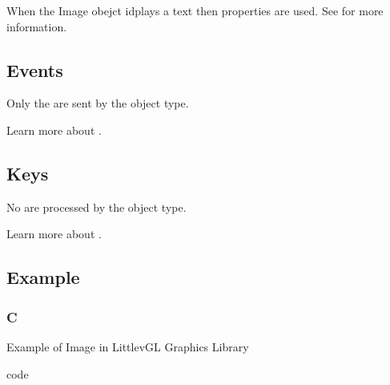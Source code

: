 \documentclass[letterpaper,10pt,english]{sphinxmanual}
\begin{document}
When the Image obejct idplays a text then  properties are used. See {\hyperref[\detokenize{object-types/label::doc}]{}} for more information.


\subsection{Events}
\label{\detokenize{object-types/img:events}}
Only the  are sent by the object type.

Learn more about {\hyperref[\detokenize{overview/events::doc}]{}}.


\subsection{Keys}
\label{\detokenize{object-types/img:keys}}
No  are processed by the object type.

Learn more about {\hyperref[\detokenize{overview/indev::doc}]{}}.


\subsection{Example}
\label{\detokenize{object-types/img:example}}

\subsubsection{C}
\label{\detokenize{object-types/img:c}}
Example of Image in LittlevGL Graphics Library 

code
\end{document}
